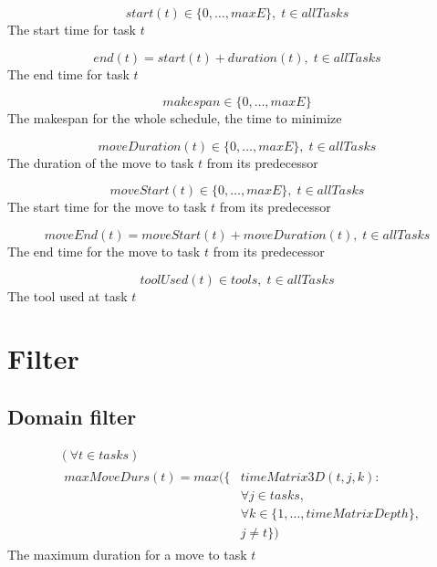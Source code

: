  \begin{equation}\label{eq:46}
 start(t) \in \{0 , \ldots , maxE\}, \; t \in allTasks\end{equation}
 The start time for task $t$
 
 \begin{equation}\label{eq:47}
 end(t) = start(t) + duration(t), \; t \in allTasks\end{equation}
 The end time for task $t$
 
 \begin{equation}\label{eq:48}
 makespan \in \{0 , \ldots , maxE\}\end{equation}
 The makespan for the whole schedule, the time to minimize
 
 \begin{equation}\label{eq:49}
 moveDuration(t) \in \{0 , \ldots , maxE\}, \; t \in allTasks\end{equation}
 The duration of the move to task $t$ from its predecessor
 
 \begin{equation}\label{eq:50}
 moveStart(t) \in \{0 , \ldots , maxE\}, \; t \in allTasks\end{equation}
 The start time for the move to task $t$ from its predecessor
 
 \begin{equation}\label{eq:51}
 moveEnd(t) = moveStart(t) + moveDuration(t), \; t \in allTasks\end{equation}
 The end time for the move to task $t$ from its predecessor
 
 \begin{equation}\label{eq:52}
 toolUsed(t) \in tools, \; t \in allTasks\end{equation}
 The tool used at task $t$
 
 
 \section{Filter}
 \subsection{Domain filter}
 
 \begin{equation}
 \begin{aligned}\label{eq:57}
 &( \forall t \in tasks)\\
 &\begin{aligned}
 maxMoveDurs(t) = max(\{&timeMatrix3D(t,j,k) :\\
 &\forall j \in tasks, \\
 &\forall k \in \{1 , \ldots , timeMatrixDepth\},\\
 &j \neq t\})
 \end{aligned}
 \end{aligned}
 \end{equation}
 The maximum duration for a move to task $t$
 
